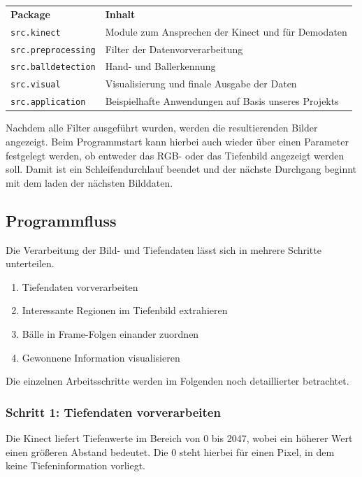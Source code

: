 \documentclass[12pt,a4paper,ngerman]{scrartcl}
\begin{document}
\begin{tabular}{ll}
\textbf{Package} & \textbf{Inhalt} \vspace{0.1cm} \\
{\lstinline!src.kinect!} & Module zum Ansprechen der Kinect und für Demodaten \\
{\lstinline!src.preprocessing!} & Filter der Datenvorverarbeitung\\
{\lstinline!src.balldetection!} & Hand- und Ballerkennung\\
{\lstinline!src.visual!} & Visualisierung und finale Ausgabe der Daten\\
{\lstinline!src.application!} & Beispielhafte Anwendungen auf Basis unseres Projekts
\end{tabular}

Nachdem alle Filter ausgeführt wurden, werden die resultierenden Bilder angezeigt. Beim Programmstart kann hierbei auch wieder über einen Parameter festgelegt werden, ob entweder das RGB- oder das Tiefenbild angezeigt werden soll. Damit ist ein Schleifendurchlauf beendet und der nächste Durchgang beginnt mit dem laden der nächsten Bilddaten.

\subsection{Programmfluss}
\label{sec:programmfluss}

Die Verarbeitung der Bild- und Tiefendaten lässt sich in mehrere Schritte unterteilen.

\begin{enumerate}
	\item Tiefendaten vorverarbeiten
	\item Interessante Regionen im Tiefenbild extrahieren
	\item Bälle in Frame-Folgen einander zuordnen
	\item Gewonnene Information visualisieren
\end{enumerate}

Die einzelnen Arbeitsschritte werden im Folgenden noch detaillierter betrachtet.

\subsubsection{Schritt 1: Tiefendaten vorverarbeiten}\label{sec:preprocess}

Die Kinect liefert Tiefenwerte im Bereich von 0 bis 2047, wobei ein höherer Wert
einen größeren Abstand bedeutet. Die 0 steht hierbei für einen Pixel, in dem keine
Tiefeninformation vorliegt.
\end{document}
